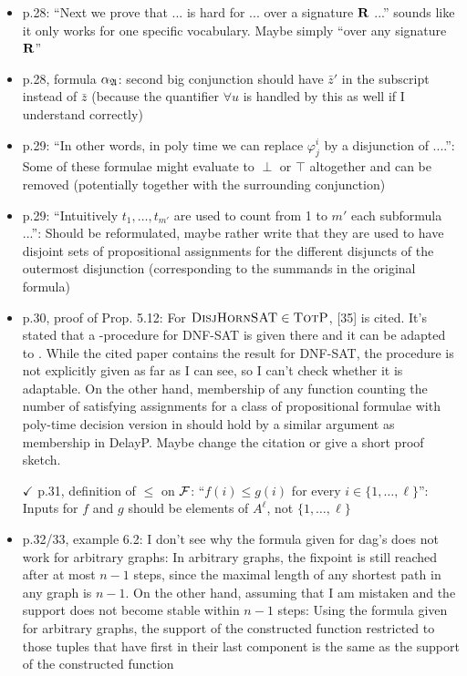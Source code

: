 \begin{itemize}
\item p.28: ``Next we prove that ... is hard for ... over a signature $\mathbf{R}$ ...'' sounds like it only works
for one specific vocabulary. Maybe simply ``over any signature $\mathbf{R}$''
\item p.28, formula $\alpha_{\mathfrak{A}}$: second big conjunction should have $\bar{z}'$ in the subscript instead of $\bar{z}$ (because
the quantifier $\forall u$ is handled by this as well if I understand correctly)
\item p.29: ``In other words, in poly time we can replace $\varphi_j^i$ by a disjunction of ....'': Some of these
formulae might evaluate to $\perp$ or $\top$ altogether and can be removed (potentially together with
the surrounding conjunction)
\item p.29: ``Intuitively $t_1,\ldots,t_{m'}$ are used to count from 1 to $m'$ each subformula ...'': Should be
reformulated, maybe rather write that they are used to have disjoint sets of propositional
assignments for the different disjuncts of the outermost disjunction (corresponding to the
summands in the original formula)
\item p.30, proof of Prop. 5.12: For $\textsc{DisjHornSAT} \in \text{\sc TotP}$, [35] is cited. It’s stated that a \totp-procedure
for DNF-SAT is given there and it can be adapted to \dhsat. While the
cited paper contains the result for DNF-SAT, the procedure is not explicitly given as far as
I can see, so I can't check whether it is adaptable. On the other hand, membership of any
function counting the number of satisfying assignments for a class of propositional formulae
with poly-time decision version in \totp should hold by a similar argument as membership in
DelayP. Maybe change the citation or give a short proof sketch.
\item[$\checkmark$] p.31, definition of $\leq$ on $\mathcal{F}$: ``$f(i) \leq g(i)$ for every $i \in \{1,\ldots,\ell\}$'': Inputs for $f$ and $g$ should be
elements of $A^{\ell}$, not $\{1,\ldots,\ell\}$
\item p.32/33, example 6.2: I don't see why the formula given for dag's does not work for arbitrary
graphs: In arbitrary graphs, the fixpoint is still reached after at most $n-1$ steps, since the
maximal length of any shortest path in any graph is $n-1$. On the other hand, assuming that
I am mistaken and the support does not become stable within $n-1$ steps: Using the formula
given for arbitrary graphs, the support of the constructed function restricted to those tuples
that have first in their last component is the same as the support of the constructed function

\end{itemize}

